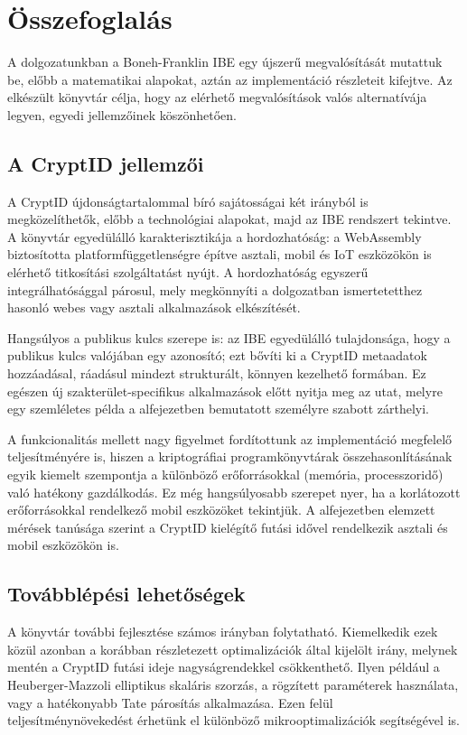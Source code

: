 \chapter{Összefoglalás}

A dolgozatunkban a Boneh-Franklin IBE egy újszerű megvalósítását mutattuk be, előbb a matematikai alapokat, aztán az implementáció részleteit kifejtve. Az elkészült könyvtár célja, hogy az elérhető megvalósítások valós alternatívája legyen, egyedi jellemzőinek köszönhetően.

\section{A CryptID jellemzői}

A CryptID újdonságtartalommal bíró sajátosságai két irányból is megközelíthetők, előbb a technológiai alapokat, majd az IBE rendszert tekintve. A könyvtár egyedülálló karakterisztikája a hordozhatóság: a WebAssembly biztosította platformfüggetlenségre építve asztali, mobil és IoT eszközökön is elérhető titkosítási szolgáltatást nyújt. A hordozhatóság egyszerű integrálhatósággal párosul, mely megkönnyíti a dolgozatban ismertetetthez hasonló webes vagy asztali alkalmazások elkészítését.

Hangsúlyos a publikus kulcs szerepe is: az IBE egyedülálló tulajdonsága, hogy a publikus kulcs valójában egy azonosító; ezt bővíti ki a CryptID metaadatok hozzáadásal, ráadásul mindezt strukturált, könnyen kezelhető formában. Ez egészen új szakterület-specifikus alkalmazások előtt nyitja meg az utat, melyre egy szemléletes példa a  alfejezetben bemutatott személyre szabott zárthelyi.

A funkcionalitás mellett nagy figyelmet fordítottunk az implementáció megfelelő teljesítményére is, hiszen a kriptográfiai programkönyvtárak összehasonlításának egyik kiemelt szempontja a különböző erőforrásokkal (memória, processzoridő) való hatékony gazdálkodás. Ez még hangsúlyosabb szerepet nyer, ha a korlátozott erőforrásokkal rendelkező mobil eszközöket tekintjük. A  alfejezetben elemzett mérések tanúsága szerint a CryptID kielégítő futási idővel rendelkezik asztali és mobil eszközökön is.

\section{Továbblépési lehetőségek}

A könyvtár további fejlesztése számos irányban folytatható. Kiemelkedik ezek közül azonban a korábban részletezett optimalizációk által kijelölt irány, melynek mentén a CryptID futási ideje nagyságrendekkel csökkenthető. Ilyen például a Heuberger-Mazzoli elliptikus skaláris szorzás, a rögzített paraméterek használata, vagy a hatékonyabb Tate párosítás alkalmazása. Ezen felül teljesítménynövekedést érhetünk el különböző mikrooptimalizációk segítségével is.

